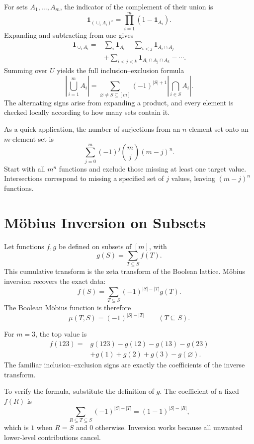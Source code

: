 For sets \(A_1,\ldots,A_m\), the indicator of the complement of their union is
\[
  \mathbf1_{(\cup_iA_i)^c}
  =\prod_{i=1}^m(1-\mathbf1_{A_i}).
\]
Expanding and subtracting from one gives
\[
\begin{aligned}
  \mathbf1_{\cup_iA_i}
  ={}&\sum_i\mathbf1_{A_i}
  -\sum_{i<j}\mathbf1_{A_i\cap A_j}\\
  &+\sum_{i<j<k}\mathbf1_{A_i\cap A_j\cap A_k}
  -\cdots.
\end{aligned}
\]
Summing over \(U\) yields the full inclusion--exclusion formula
\[
  \left|\bigcup_{i=1}^mA_i\right|
  =
  \sum_{\varnothing\ne S\subseteq[m]}
  (-1)^{|S|+1}
  \left|\bigcap_{i\in S}A_i\right|.
\]
The alternating signs arise from expanding a product, and every element is checked locally according to how many sets contain it.

As a quick application, the number of surjections from an \(n\)-element set onto an \(m\)-element set is
\[
  \sum_{j=0}^m(-1)^j
  \binom mj(m-j)^n.
\]
Start with all \(m^n\) functions and exclude those missing at least one target value.  Intersections correspond to missing a specified set of \(j\) values, leaving \((m-j)^n\) functions.

\section{Möbius Inversion on Subsets}

Let functions \(f,g\) be defined on subsets of \([m]\), with
\[
  g(S)=\sum_{T\subseteq S}f(T).
\]
This cumulative transform is the zeta transform of the Boolean lattice.  Möbius inversion recovers the exact data:
\[
  \boxed{
  f(S)=
  \sum_{T\subseteq S}
  (-1)^{|S|-|T|}g(T).}
\]
The Boolean Möbius function is therefore
\[
  \mu(T,S)=(-1)^{|S|-|T|}
  \qquad(T\subseteq S).
\]

For \(m=3\), the top value is
\[
\begin{aligned}
  f(123)={}&g(123)
  -g(12)-g(13)-g(23)\\
  &+g(1)+g(2)+g(3)-g(\varnothing).
\end{aligned}
\]
The familiar inclusion--exclusion signs are exactly the coefficients of the inverse transform.

To verify the formula, substitute the definition of \(g\).  The coefficient of a fixed \(f(R)\) is
\[
  \sum_{R\subseteq T\subseteq S}
  (-1)^{|S|-|T|}
  =(1-1)^{|S|-|R|},
\]
which is \(1\) when \(R=S\) and \(0\) otherwise.  Inversion works because all unwanted lower-level contributions cancel.

